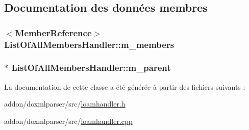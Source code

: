 \subsection{Documentation des données membres}
\hypertarget{class_list_of_all_members_handler_a14a4aad7648733c9ecca9d1365dcfbc8}{}
\subsubsection[{m\+\_\+members}]{$<${\bf Member\+Reference}$>$ List\+Of\+All\+Members\+Handler\+::m\+\_\+members\hspace{0.3cm}{\ttfamily [protected]}}\label{class_list_of_all_members_handler_a14a4aad7648733c9ecca9d1365dcfbc8}
\hypertarget{class_list_of_all_members_handler_a89e0a78b3ddc9d822c23cd3126a377de}{}
\subsubsection[{m\+\_\+parent}]{$\ast$ List\+Of\+All\+Members\+Handler\+::m\+\_\+parent\hspace{0.3cm}{\ttfamily [protected]}}\label{class_list_of_all_members_handler_a89e0a78b3ddc9d822c23cd3126a377de}


La documentation de cette classe a été générée à partir des fichiers suivants \+:\begin{DoxyCompactItemize}
\item 
addon/doxmlparser/src/\hyperlink{loamhandler_8h}{loamhandler.\+h}\item 
addon/doxmlparser/src/\hyperlink{loamhandler_8cpp}{loamhandler.\+cpp}\end{DoxyCompactItemize}
